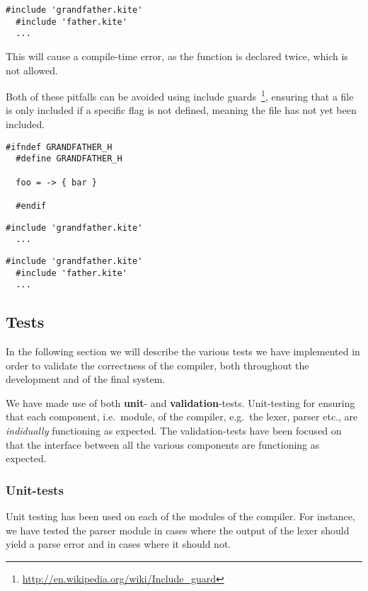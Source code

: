 \begin{lstlisting}[caption=\code{child.kite}]
  #include 'grandfather.kite'
  #include 'father.kite'
  ...
\end{lstlisting}

This will cause a compile-time error, as the  function is declared twice, which is not allowed.

Both of these pitfalls can be avoided using include guards~\footnote{\url{http://en.wikipedia.org/wiki/Include_guard}}, ensuring that a file is only included if a specific flag is not defined, meaning the file has not yet been included.

\begin{lstlisting}[caption=\code{grandfather.kite}]
  #ifndef GRANDFATHER_H
  #define GRANDFATHER_H

  foo = -> { bar }

  #endif
\end{lstlisting}

\begin{lstlisting}[caption=\code{father.kite}]
  #include 'grandfather.kite'
  ...
\end{lstlisting}

\begin{lstlisting}[caption=\code{child.kite}]
  #include 'grandfather.kite'
  #include 'father.kite'
  ...
\end{lstlisting}


\subsection{Tests}
In the following section we will describe the various tests we have implemented in order to validate the correctness of the compiler, both throughout the development and of the final system.

We have made use of both \textbf{unit}- and \textbf{validation}-tests. Unit-testing for ensuring that each component, i.e.\ module, of the compiler, e.g.\ the lexer, parser etc., are \emph{indidually} functioning as expected. The validation-tests have been focused on that the interface between all the various components are functioning as expected.

\subsubsection{Unit-tests}
Unit testing has been used on each of the modules of the compiler. For instance, we have tested the parser module in cases where the output of the lexer should yield a parse error and in cases where it should not.

